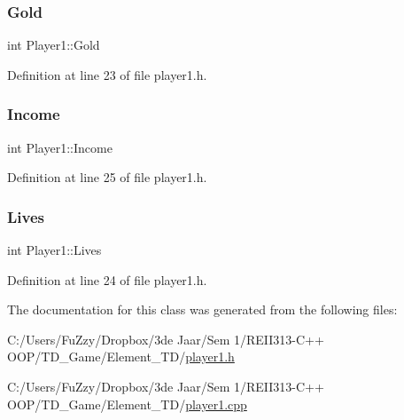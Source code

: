 \subsubsection{\texorpdfstring{Gold}{Gold}}
{\footnotesize\ttfamily int Player1\+::\+Gold}



Definition at line 23 of file player1.\+h.

\mbox{\label{class_player1_a414fae948c79246f6a98554718f0cd99}} 
\subsubsection{\texorpdfstring{Income}{Income}}
{\footnotesize\ttfamily int Player1\+::\+Income}



Definition at line 25 of file player1.\+h.

\mbox{\label{class_player1_aacba034528d5c9fdefa4f246fe526a38}} 
\subsubsection{\texorpdfstring{Lives}{Lives}}
{\footnotesize\ttfamily int Player1\+::\+Lives}



Definition at line 24 of file player1.\+h.



The documentation for this class was generated from the following files\+:\begin{DoxyCompactItemize}
\item 
C\+:/\+Users/\+Fu\+Zzy/\+Dropbox/3de Jaar/\+Sem 1/\+R\+E\+I\+I313-\/\+C++ O\+O\+P/\+T\+D\+\_\+\+Game/\+Element\+\_\+\+T\+D/\hyperlink{player1_8h}{player1.\+h}\item 
C\+:/\+Users/\+Fu\+Zzy/\+Dropbox/3de Jaar/\+Sem 1/\+R\+E\+I\+I313-\/\+C++ O\+O\+P/\+T\+D\+\_\+\+Game/\+Element\+\_\+\+T\+D/\hyperlink{player1_8cpp}{player1.\+cpp}\end{DoxyCompactItemize}
